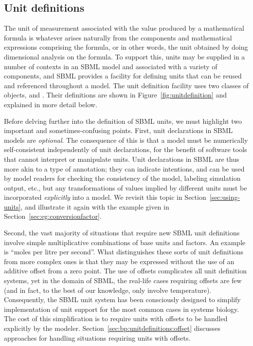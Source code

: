 \subsection{Unit definitions}
\label{sec:unitdefinitions}

The unit of measurement associated with the value produced by a
mathematical formula is whatever arises naturally from the
components and mathematical expressions comprising the formula, or
in other words, the unit obtained by doing dimensional analysis on
the formula.  To support this, units may be supplied in a number
of contexts in an SBML model and associated with a variety of
components, and SBML provides a facility for defining units that
can be reused and referenced throughout a model.  The unit
definition facility uses two classes of objects, \UnitDefinition
and \Unit.  Their definitions are shown in
Figure~\vref{fig:unitdefinition} and explained in more detail
below.

Before delving further into the definition of SBML units, we must
highlight two important and sometimes-confusing points.  First,
unit declarations in SBML models are \emph{optional}.  The
consequence of this is that a model must be numerically
self-consistent independently of unit declarations, for the
benefit of software tools that cannot interpret or manipulate
units.  Unit declarations in SBML are thus more akin to a type of
annotation; they can indicate intentions, and can be used by model
readers for checking the consistency of the model, labeling
simulation output, etc., but any transformations of values implied
by different units must be incorporated \emph{explicitly} into a
model.  We revisit this topic in Section~\ref{sec:using-units},
and illustrate it again with the example given in
Section~\ref{sec:eg:conversionfactor}.

Second, the vast majority of situations that require new SBML unit
definitions involve simple multiplicative combinations of base
units and factors.  An example is ``moles per litre per second''.
What distinguishes these sorts of unit definitions from more
complex ones is that they may be expressed without the use of an
additive offset from a zero point.  The use of offsets complicates
all unit definition systems, yet in the domain of SBML, the
real-life cases requiring offsets are few (and in fact, to the
best of our knowledge, only involve temperature).  Consequently,
the SBML unit system has been consciously designed to simplify
implementation of unit support for the most common cases in
systems biology.  The cost of this simplification is to require
units with offsets to be handled explicitly by the modeler.
Section~\ref{sec:bp:unitdefinitions:offset} discusses approaches
for handling situations requiring units with offsets.


